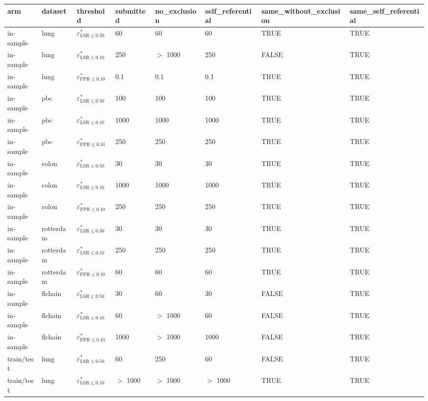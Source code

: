 \begin{tabular}{llllllll}
  \toprule
arm & dataset & threshold & submitted & no\_exclusion & self\_referential & same\_without\_exclusion & same\_self\_referential \\ 
  \midrule
in-sample & lung & $\varepsilon^{*}_{\mathrm{LSR} \leq 0.50}$ & 60 & 60 & 60 & TRUE & TRUE \\ 
  in-sample & lung & $\varepsilon^{*}_{\mathrm{LSR} \leq 0.10}$ & 250 & $>$ 1000 & 250 & FALSE & TRUE \\ 
  in-sample & lung & $\varepsilon^{*}_{\mathrm{FPR} \leq 0.10}$ & 0.1 & 0.1 & 0.1 & TRUE & TRUE \\ 
  in-sample & pbc & $\varepsilon^{*}_{\mathrm{LSR} \leq 0.50}$ & 100 & 100 & 100 & TRUE & TRUE \\ 
  in-sample & pbc & $\varepsilon^{*}_{\mathrm{LSR} \leq 0.10}$ & 1000 & 1000 & 1000 & TRUE & TRUE \\ 
  in-sample & pbc & $\varepsilon^{*}_{\mathrm{FPR} \leq 0.10}$ & 250 & 250 & 250 & TRUE & TRUE \\ 
  in-sample & colon & $\varepsilon^{*}_{\mathrm{LSR} \leq 0.50}$ & 30 & 30 & 30 & TRUE & TRUE \\ 
  in-sample & colon & $\varepsilon^{*}_{\mathrm{LSR} \leq 0.10}$ & 1000 & 1000 & 1000 & TRUE & TRUE \\ 
  in-sample & colon & $\varepsilon^{*}_{\mathrm{FPR} \leq 0.10}$ & 250 & 250 & 250 & TRUE & TRUE \\ 
  in-sample & rotterdam & $\varepsilon^{*}_{\mathrm{LSR} \leq 0.50}$ & 30 & 30 & 30 & TRUE & TRUE \\ 
  in-sample & rotterdam & $\varepsilon^{*}_{\mathrm{LSR} \leq 0.10}$ & 250 & 250 & 250 & TRUE & TRUE \\ 
  in-sample & rotterdam & $\varepsilon^{*}_{\mathrm{FPR} \leq 0.10}$ & 60 & 60 & 60 & TRUE & TRUE \\ 
  in-sample & flchain & $\varepsilon^{*}_{\mathrm{LSR} \leq 0.50}$ & 30 & 60 & 30 & FALSE & TRUE \\ 
  in-sample & flchain & $\varepsilon^{*}_{\mathrm{LSR} \leq 0.10}$ & 60 & $>$ 1000 & 60 & FALSE & TRUE \\ 
  in-sample & flchain & $\varepsilon^{*}_{\mathrm{FPR} \leq 0.10}$ & 1000 & $>$ 1000 & 1000 & FALSE & TRUE \\ 
  train/test & lung & $\varepsilon^{*}_{\mathrm{LSR} \leq 0.50}$ & 60 & 250 & 60 & FALSE & TRUE \\ 
  train/test & lung & $\varepsilon^{*}_{\mathrm{LSR} \leq 0.10}$ & $>$ 1000 & $>$ 1000 & $>$ 1000 & TRUE & TRUE \\ 

\end{tabular}
